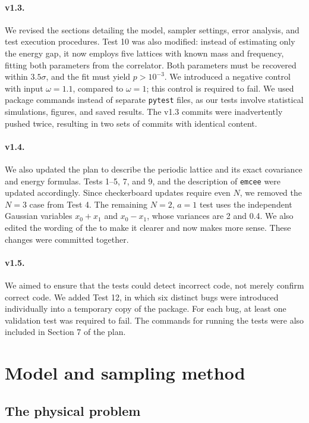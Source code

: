 \documentclass[11pt]{article}
\begin{document}
\paragraph{v1.3.} We revised the sections detailing the model, sampler
settings, error analysis, and test execution procedures. Test 10 was
also modified: instead of estimating only the energy gap, it now employs five
lattices with known mass and frequency, fitting both parameters from the
correlator. Both parameters must be recovered within $3.5\sigma$, and the fit
must yield $p > 10^{-3}$. We introduced a negative control with input
$\omega = 1.1$, compared to $\omega = 1$; this control is required to fail. We
used package commands instead of separate \texttt{pytest} files, as our tests
involve statistical simulations, figures, and saved results. The v1.3 commits
were inadvertently pushed twice, resulting in two sets of commits with
identical content.

\paragraph{v1.4.} We also updated the plan to describe the periodic lattice and
its exact covariance and energy formulas. Tests 1--5, 7, and 9, and the
description of \texttt{emcee} were updated accordingly. Since checkerboard
updates require even $N$, we removed the $N = 3$ case from Test 4. The
remaining $N = 2$, $a = 1$ test uses the independent Gaussian variables
$x_0 + x_1$ and $x_0 - x_1$, whose variances are 2 and 0.4. We also edited the
wording of the  to make it clearer and now makes more sense. These changes were committed together.

\paragraph{v1.5.} We aimed to ensure that the tests could detect incorrect
code, not merely confirm correct code. We added Test 12, in which six distinct
bugs were introduced individually into a temporary copy of the package. For
each bug, at least one validation test was required to fail. The commands for
running the tests were also included in Section 7 of the plan.


\section{Model and sampling method}\label{sec:model}

\subsection{The physical problem}
\end{document}

